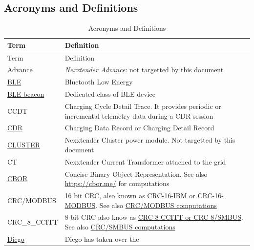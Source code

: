 \documentclass[a4paper]{article}
\begin{document}
\subsection{Acronyms and Definitions}
\label{acronyms_and_definitions}
\begin{longtable}[]{ p{4cm}   p{12cm} }
	\caption{Acronyms and Definitions}
	\label{table.1}  
	\tabularnewline
	\toprule\noalign{}
	Term & Definition \\
	\midrule\noalign{}
	\endfirsthead
	\toprule\noalign{}
	Term & Definition \\
	\midrule\noalign{}
	\endhead
	\bottomrule\noalign{}
	\endlastfoot
	Advance & \emph{Nexxtender Advance}: not targetted by this document \\
	\href{https://bluetoothle.wiki/start}{BLE} & Bluetooth Low Energy \\
	\href{https://en.wikipedia.org/wiki/Bluetooth_Low_Energy_beacon}{BLE beacon} & Dedicated class of BLE device \\
	CCDT & Charging Cycle Detail Trace. 
	It provides periodic or incremental telemetry data during a CDR session\\
	\href{https://saascharge.com/glossary/}{CDR} & Charging Data Record or Charging Detail Record \\
	\href{https://www.cebeo.be/catalog/nl-be/products/powerdale-nexxtender-cluster-power-module-t2-plug-32a-voor-1-laadpunt--6486546}{CLUSTER} & Nexxtender Cluster power module. Not targetted by this document\\
	CT & Nexxtender Current Transformer attached to the grid \\
	\href{https://en.wikipedia.org/wiki/CBOR}{CBOR} & Concise Binary Object
	Representation. See also \url{https://cbor.me/} for computations \\
	CRC/MODBUS & 16 bit CRC, also known as
	\href{https://en.wikipedia.org/wiki/Cyclic_redundancy_check}{CRC-16-IBM}
	or \href{https://en.wikipedia.org/wiki/Modbus}{CRC-16-MODBUS}. 
 	See also	\href{https://crccalc.com/?crc=123456789&method=CRC-16/MODBUS&datatype=ascii&outtype=hex}{CRC/MODBUS 
	computations} \\
	CRC\_8\_CCITT & 8 bit CRC also know as
	\href{https://en.wikipedia.org/wiki/Cyclic_redundancy_check}{CRC-8-CCITT
	or CRC-8/SMBUS}. See also
	\href{https://crccalc.com/?crc=263b130bff13b97472d0143635984d0bb76c7bb6f45dfcc381& method=CRC-8/SMBUS&datatype=hex&outtype=hex}{CRC/SMBUS  
	computations} \\
	\href{https://www.mydiego.lu/en}{Diego} & Diego has taken over the

\end{longtable}
\end{document}
